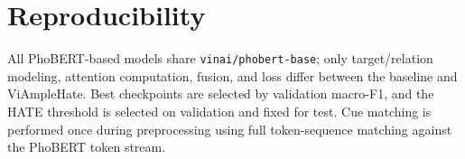 \documentclass[11pt]{article}
\begin{document}
\section{Reproducibility}
\label{sec:repro}
All PhoBERT-based models share \texttt{vinai/phobert-base}; only target/relation modeling, attention computation, fusion, and loss differ between the baseline and ViAmpleHate. Best checkpoints are selected by validation macro-F1, and the HATE threshold is selected on validation and fixed for test. Cue matching is performed once during preprocessing using full token-sequence matching against the PhoBERT token stream.
\end{document}
